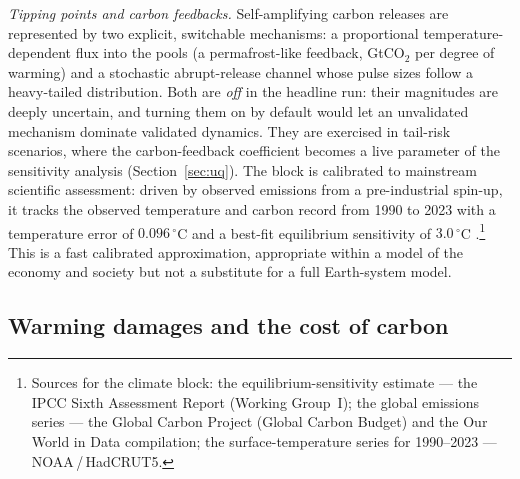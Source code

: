\documentclass[a4paper,fleqn]{cas-sc}
\begin{document}
\emph{Tipping points and carbon feedbacks.} Self-amplifying carbon releases are represented by two
explicit, switchable mechanisms: a proportional temperature-dependent flux into the pools (a
permafrost-like feedback, GtCO$_2$ per degree of warming) and a stochastic abrupt-release channel
whose pulse sizes follow a heavy-tailed distribution. Both are \emph{off} in the headline run:
their magnitudes are deeply uncertain, and turning them on by default would let an unvalidated
mechanism dominate validated dynamics. They are exercised in tail-risk scenarios, where the
carbon-feedback coefficient becomes a live parameter of the sensitivity analysis
(Section~\ref{sec:uq}). The block is calibrated to mainstream scientific assessment: driven by observed emissions from a
pre-industrial spin-up, it tracks the observed temperature and carbon record from 1990 to 2023
with a temperature error of $0.096\,^\circ$C and a best-fit equilibrium sensitivity of
$3.0\,^\circ$C \citep{ipcc_ar6_wg1,friedlingstein2023}.\footnote{Sources for the climate block: the
equilibrium-sensitivity estimate --- the IPCC Sixth Assessment Report (Working Group~I); the global
emissions series --- the Global Carbon Project (Global Carbon Budget) and the Our World in Data
compilation; the surface-temperature series for 1990--2023 --- NOAA\,/\,HadCRUT5.} This is a fast
calibrated approximation, appropriate within a model of the economy and society but not a substitute
for a full Earth-system model.

\subsection{Warming damages and the cost of carbon}
\end{document}
